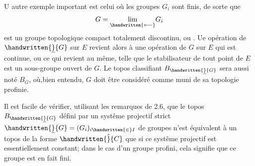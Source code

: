  U autre exemple important est celui où les groupes $G_i$ sont finis, de sorte que
\[
G=\underset{\handwritten{\longleftarrow}}{\lim}G_i
\]
est un groupe topologique compact totalement discontinu, ou  . Ue opération de $\handwritten{\underline}{G}$ sur $E$ revient alors à une opération de $G$ sur $E$ qui est continue, ou ce qui revient au même, telle que le stabilisateur de tout point de $E$ est un sous-groupe ouvert de $G$. Le topos classifiant $B_{\handwritten{\underline}{G}}$ sera aussi noté $B_G$, où,bien entendu, $G$ doit être considéré comme muni de sa topologie profinie.

 Il est facile de vérifier, utilisant les remarques de 2.6, que le topos $B_{\handwritten{\underline}{G}}$ défini par un systême projectif strict  $\handwritten{\underline}{G}=(G_i)_{i\handwritten{\in}I}$ de groupes n'est équivalent à un topos de la forme $\handwritten{\hat}{C}$ que si ce systême projectif est essentiellement constant; dans le cas d'un groupe profini, cela signifie que ce groupe est en fait fini.

